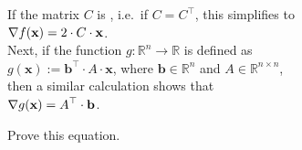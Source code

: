 If the matrix $C$ is , i.e.~if $C = C^\top$, this simplifies to
\\[0.2cm]
\hspace*{1.3cm}
$\displaystyle \nabla f(\mathbf{x}) = 2 \cdot C \cdot \mathbf{x}$.
\\[0.2cm]
Next, if the function $g: \mathbb{R}^n \rightarrow \mathbb{R}$ is defined as 
\\[0.2cm]
\hspace*{1.3cm}
$g(\mathbf{x}) := \mathbf{b}^\top \cdot A \cdot \mathbf{x}$, \quad where $\mathbf{b} \in \mathbb{R}^n$ and $A \in \mathbb{R}^{n \times n}$,
\\[0.2cm]
then a similar calculation shows that
\\[0.2cm]
\hspace*{1.3cm}
$\displaystyle \nabla g(\mathbf{x}) = A^\top \cdot \mathbf{b}$.

\exercise
Prove this equation.


